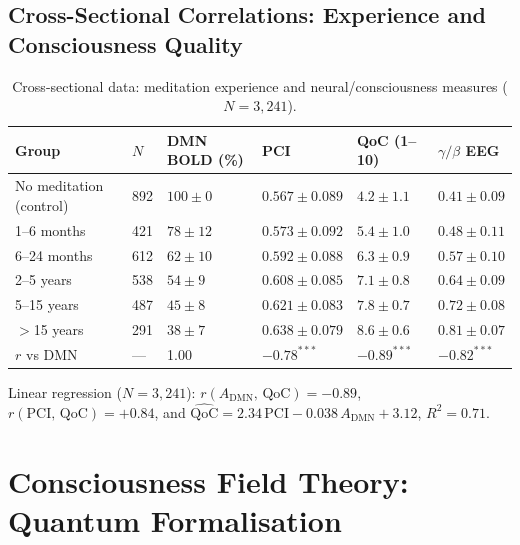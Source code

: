 \documentclass[12pt,a4paper]{article}
\theoremstyle{plain}
\theoremstyle{definition}
\theoremstyle{remark}
\newcommand{\DMN}{\mathrm{DMN}}
\newcommand{\PCI}{\mathrm{PCI}}
\begin{document}

\subsection{Cross-Sectional Correlations: Experience and Consciousness Quality}

\begin{table}[htbp]
\centering
\caption{Cross-sectional data: meditation experience and neural/consciousness measures ($N=3{,}241$).}
\label{tab:experience}
\renewcommand{\arraystretch}{1.2}
\begin{tabular}{p{3cm}p{1cm}p{2cm}p{2.5cm}p{2.2cm}p{2.4cm}}
\toprule
\rowcolor{hdrcol}
\color{white}\textbf{Group} & \color{white}$N$ & \color{white}\textbf{DMN BOLD (\%)} & \color{white}\textbf{PCI} & \color{white}\textbf{QoC (1--10)} & \color{white}$\gamma/\beta$ EEG \\
\midrule
No meditation (control)& 892 & $100\pm 0$    & $0.567\pm 0.089$ & $4.2\pm 1.1$ & $0.41\pm 0.09$ \\
1--6 months             & 421 & $78\pm 12$    & $0.573\pm 0.092$ & $5.4\pm 1.0$ & $0.48\pm 0.11$ \\
6--24 months            & 612 & $62\pm 10$    & $0.592\pm 0.088$ & $6.3\pm 0.9$ & $0.57\pm 0.10$ \\
2--5 years              & 538 & $54\pm 9$     & $0.608\pm 0.085$ & $7.1\pm 0.8$ & $0.64\pm 0.09$ \\
5--15 years             & 487 & $45\pm 8$     & $0.621\pm 0.083$ & $7.8\pm 0.7$ & $0.72\pm 0.08$ \\
$>$15 years            & 291 & $38\pm 7$     & $0.638\pm 0.079$ & $8.6\pm 0.6$ & $0.81\pm 0.07$ \\
\midrule
$r$ vs DMN & --- & 1.00 & $-0.78^{***}$ & $-0.89^{***}$ & $-0.82^{***}$ \\
\bottomrule
\end{tabular}
\end{table}

Linear regression ($N=3{,}241$): $r(A_{\DMN},\,\mathrm{QoC}) = -0.89$, $r(\PCI,\,\mathrm{QoC}) = +0.84$,
and $\widehat{\mathrm{QoC}} = 2.34\,\PCI - 0.038\,A_{\DMN} + 3.12$, $R^2 = 0.71$.

\section{Consciousness Field Theory: Quantum Formalisation}
\label{sec:cft}
\end{document}

